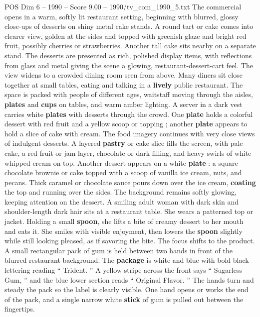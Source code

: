\begin{textsample}{POS Dim 6 – 1990 – Score 9.00 – 1990/tv\_com\_1990\_5.txt}  \label{ex:f6_pos_074}
The commercial opens in a warm, softly lit restaurant setting, beginning with blurred, glossy close-ups of desserts on shiny metal cake stands.
A round tart or cake comes into clearer view, golden at the sides and topped with greenish glaze and bright red fruit, possibly cherries or strawberries.
Another tall cake sits nearby on a separate stand.
The desserts are presented as rich, polished display items, with reflections from glass and metal giving the scene a glowing, restaurant-dessert-cart feel.
The view widens to a crowded dining room seen from above.
Many diners sit close together at small tables, eating and talking in a \textbf{lively} public restaurant.
The space is packed with people of different ages, waitstaff moving through the aisles, \textbf{plates} and \textbf{cups} on tables, and warm amber lighting.
A server in a dark vest carries white \textbf{plates} with desserts through the crowd.
One \textbf{plate} holds a colorful dessert with red fruit and a yellow scoop or topping ; another \textbf{plate} appears to hold a slice of cake with cream.
The food imagery continues with very close views of indulgent desserts.
A layered \textbf{pastry} or cake slice fills the screen, with pale cake, a red fruit or jam layer, chocolate or dark filling, and heavy swirls of white whipped cream on top.
Another dessert appears on a white \textbf{plate} : a square chocolate brownie or cake topped with a scoop of vanilla ice cream, nuts, and pecans.
Thick caramel or chocolate sauce pours down over the ice cream, \textbf{coating} the top and running over the sides.
The background remains softly glowing, keeping attention on the dessert.
A smiling adult woman with dark skin and shoulder-length dark hair sits at a restaurant table.
She wears a patterned top or jacket.
Holding a small \textbf{spoon}, she lifts a bite of creamy dessert to her mouth and eats it.
She smiles with visible enjoyment, then lowers the \textbf{spoon} slightly while still looking pleased, as if savoring the bite.
The focus shifts to the product.
A small rectangular pack of gum is held between two hands in front of the blurred restaurant background.
The \textbf{package} is white and blue with bold black lettering reading “ Trident. ” A yellow stripe across the front says “ Sugarless Gum, ” and the blue lower section reads “ Original Flavor. ” The hands turn and steady the pack so the label is clearly visible.
One hand opens or works the end of the pack, and a single narrow white \textbf{stick} of gum is pulled out between the fingertips.

\end{textsample}
